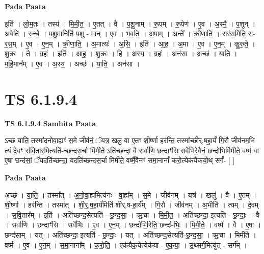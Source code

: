 \documentclass[17pt]{extarticle}
\begin{document}
\textbf{Pada Paata} \newline

इति॑ । लो॒म॒तः । तस्य॑ । मि॒मी॒त॒ । ए॒तत् । वै । प॒शू॒नाम् । रू॒पम् । रू॒पेण॑ । ए॒व । अ॒स्मै॒ । प॒शून् । अवेति॑ । रु॒न्धे॒ । प॒शु॒मानिति॑ पशु - मान् । ए॒व । भ॒व॒ति॒ । अ॒पाम् । अन्ते᳚ । क्री॒णा॒ति॒ । सर॑स॒मिति॒ स-र॒स॒म् । ए॒व । ए॒न॒म् । क्री॒णा॒ति॒ । अ॒मात्यः॑ । अ॒सि॒ । इति॑ । आ॒ह॒ । अ॒मा । ए॒व । ए॒न॒म् । कु॒रु॒ते॒ । शु॒क्रः । ते॒ । ग्रहः॑ । इति॑ । आ॒ह॒ । शु॒क्रः । हि । अ॒स्य॒ । ग्रहः॑ । अन॑सा । अच्छ॑ । या॒ति॒ । म॒हि॒मान᳚म् । ए॒व । अ॒स्य॒ । अच्छ॑ । या॒ति॒ । अन॑सा ।  \newline




\section*{ TS 6.1.9.4 }

\textbf{TS 6.1.9.4 } \newline
\textbf{Samhita Paata} \newline

ऽच्छ॑ याति॒ तस्मा॑दनोवा॒ह्यꣳ॑ स॒मे जीव॑नं॒ ॅयत्र॒ खलु॒ वा ए॒तꣳ शी॒र्ष्णा हर॑न्ति॒ तस्मा᳚च्छीर्.षहा॒र्यं॑ गि॒रौ जीव॑नम॒भि त्यं दे॒वꣳ स॑वि॒तार॒मित्यति॑-च्छन्दस॒र्चा मि॑मी॒ते ऽति॑च्छन्दा॒ वै सर्वा॑णि॒ छन्दाꣳ॑सि॒ सर्वे॑भिरे॒वैनं॒ छन्दो॑भिर्मिमीते॒ वर्ष्म॒ वा ए॒षा छन्द॑सां॒ ॅयदति॑च्छन्दा॒ यदति॑च्छन्दस॒र्चा मिमी॑ते॒ वर्ष्मै॒वैनꣳ॑ समा॒नानां᳚ करो॒त्येक॑यैकयो॒थ् सर्गं॑- [  ] \newline

\textbf{Pada Paata} \newline

अच्छ॑ । या॒ति॒ । तस्मा᳚त् । अ॒नो॒वा॒ह्य॑मित्य॑नः - वा॒ह्य᳚म् । स॒मे । जीव॑नम् । यत्र॑ । खलु॑ । वै । ए॒तम् । शी॒र्ष्णा । हर॑न्ति । तस्मा᳚त् । शी॒र्॒.ष॒हा॒र्य॑मिति॑ शीर्.ष-हा॒र्य᳚म् । गि॒रौ । जीव॑नम् । अ॒भीति॑ । त्यम् । दे॒वम् । स॒वि॒तार᳚म् । इति॑ । अति॑च्छन्द॒सेत्यति॑ - छ॒न्द॒सा॒ । ऋ॒चा । मि॒मी॒त॒ । अति॑च्छन्दा॒ इत्यति॑ - छ॒न्दाः॒ । वै । सर्वा॑णि । छन्दाꣳ॑सि । सर्वे॑भिः । ए॒व । ए॒न॒म् । छन्दो॑भि॒रिति॒ छन्दः॑-भिः॒ । मि॒मी॒ते॒ । वर्ष्म॑ । वै । ए॒षा । छन्द॑साम् । यत् । अति॑च्छन्दा॒ इत्यति॑ - छ॒न्दाः॒ । यत् । अति॑च्छन्द॒सेत्यति॑-छ॒न्द॒सा॒ । ऋ॒चा । मिमी॑ते । वर्ष्म॑ । ए॒व । ए॒न॒म् । स॒मा॒नाना᳚म् । क॒रो॒ति॒ । एक॑यैक॒येत्येक॑या - ए॒क॒या॒ । उ॒थ्सर्ग॒मित्यु॑त् - सर्ग᳚म् ।  \newline
\end{document}
